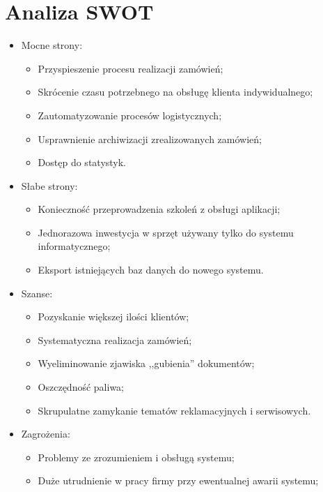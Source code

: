 \documentclass[12pt,a4paper]{article}
\begin{document}
	\section{Analiza SWOT}
		\begin{itemize}
		 \item Mocne strony:
			\begin{itemize}
				\item Przyspieszenie procesu realizacji zamówień;
				\item Skrócenie czasu potrzebnego na obsługę klienta indywidualnego;
				\item Zautomatyzowanie procesów logistycznych;
				\item Usprawnienie archiwizacji zrealizowanych zamówień;
				\item Dostęp do statystyk.
			\end{itemize}
		\item Słabe strony:
			\begin{itemize}
				\item Konieczność przeprowadzenia szkoleń z obsługi aplikacji;
				\item Jednorazowa inwestycja w sprzęt używany tylko do systemu informatycznego;
				\item Eksport istniejących baz danych do nowego systemu.
			\end{itemize}
		\item Szanse:
			\begin{itemize}
				\item Pozyskanie większej ilości klientów;
    			\item Systematyczna realizacja zamówień;
    			\item Wyeliminowanie zjawiska ,,gubienia'' dokumentów;
    			\item Oszczędność paliwa;
    			\item Skrupulatne zamykanie tematów reklamacyjnych i serwisowych.
			\end{itemize}
		\item Zagrożenia:
			\begin{itemize}
				\item Problemy ze zrozumieniem i obsługą systemu;
				\item Duże utrudnienie w pracy firmy przy ewentualnej awarii systemu;
			\end{itemize}
	\end{itemize}		 

	\newpage
	
\end{document}
